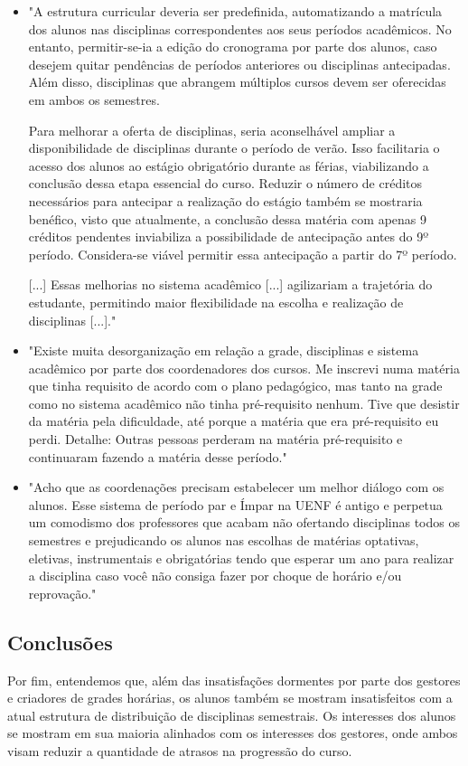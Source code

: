         \begin{itemize}
            \item "A estrutura curricular deveria ser predefinida, automatizando a matrícula dos alunos nas disciplinas correspondentes aos seus períodos acadêmicos. No entanto, permitir-se-ia a edição do cronograma por parte dos alunos, caso desejem quitar pendências de períodos anteriores ou disciplinas antecipadas. Além disso, disciplinas que abrangem múltiplos cursos devem ser oferecidas em ambos os semestres.

            Para melhorar a oferta de disciplinas, seria aconselhável ampliar a disponibilidade de disciplinas durante o período de verão. Isso facilitaria o acesso dos alunos ao estágio obrigatório durante as férias, viabilizando a conclusão dessa etapa essencial do curso. Reduzir o número de créditos necessários para antecipar a realização do estágio também se mostraria benéfico, visto que atualmente, a conclusão dessa matéria com apenas 9 créditos pendentes inviabiliza a possibilidade de antecipação antes do 9º período. Considera-se viável permitir essa antecipação a partir do 7º período.
            
            [...]
            Essas melhorias no sistema acadêmico [...] agilizariam a trajetória do estudante, permitindo maior flexibilidade na escolha e realização de disciplinas [...]."
            \item "Existe muita desorganização em relação a grade, disciplinas e sistema acadêmico por parte dos coordenadores dos cursos. Me inscrevi numa matéria que tinha requisito de acordo com o plano pedagógico, mas tanto na grade como no sistema acadêmico não tinha pré-requisito nenhum. Tive que desistir da matéria pela dificuldade, até porque a matéria que era pré-requisito eu perdi. Detalhe: Outras pessoas perderam na matéria pré-requisito e continuaram fazendo a matéria desse período."
            \item "Acho que as coordenações precisam estabelecer um melhor diálogo com os alunos. Esse sistema de período par e Ímpar na UENF é antigo e perpetua um comodismo dos professores que acabam não ofertando disciplinas todos os semestres e prejudicando os alunos nas escolhas de matérias optativas, eletivas, instrumentais e obrigatórias tendo que esperar um ano para realizar a disciplina caso você não consiga fazer por choque de horário e/ou reprovação."
        \end{itemize}

    \subsection{Conclusões} %

        Por fim, entendemos que, além das insatisfações dormentes por parte dos gestores e criadores de grades horárias, os alunos também se mostram insatisfeitos com a atual estrutura de distribuição de disciplinas semestrais. Os interesses dos alunos se mostram em sua maioria alinhados com os interesses dos gestores, onde ambos visam reduzir a quantidade de atrasos na progressão do curso.
